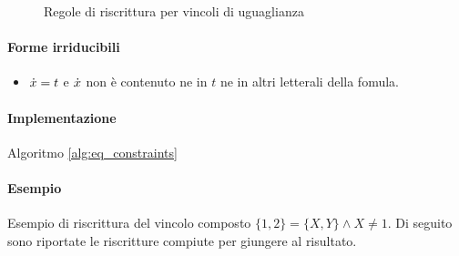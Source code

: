 \documentclass[12pt,a4paper,openright]{book}  %
\begin{document}
\begin{figure}
\begin{tcolorbox}[colframe=black, colback=white, sharp corners]
	\end{tcolorbox}

	\caption{Regole di riscrittura per vincoli di uguaglianza}
	\label{fig:eq_constraints}
\end{figure}

\paragraph{Forme irriducibili}
\begin{itemize}
	\item $\dot{x} = t$ e $\dot{x}$ non è contenuto ne in $t$ ne in
          altri letterali della fomula.
\end{itemize}

\paragraph{Implementazione}
Algoritmo \ref{alg:eq_constraints}

\paragraph{Esempio}
Esempio di riscrittura del vincolo composto $\{1,2\} = \{X,Y\} \land X \neq 1$.
Di seguito sono riportate le riscritture compiute per giungere al risultato.
\end{document}
